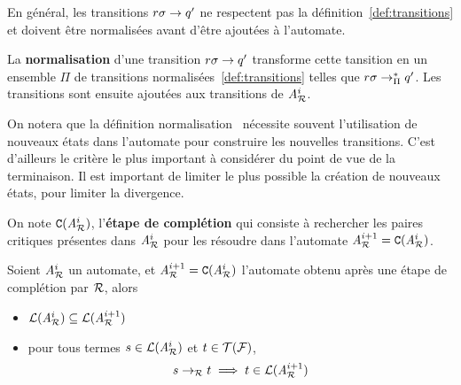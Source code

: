 En général, les transitions $r\sigma \rightarrow q'$ ne respectent pas la définition~\ref{def:transitions}
et doivent être normalisées avant d'être ajoutées à l'automate.


\begin{definition}
  La \textbf{normalisation} d'une transition $r\sigma \rightarrow q'$ transforme cette
  tansition en un ensemble $\Pi$ de transitions normalisées~\ref{def:transitions}
  telles que $r\sigma \rightarrow_\Pi^* q'$. Les transitions sont ensuite ajoutées aux transitions de ${\mathit A}_{\mathcal R}^i$.
\end{definition}
On notera que la définition normalisation~\cite{Genet-RTA98} nécessite 
souvent l'utilisation de nouveaux états dans l'automate pour construire 
les nouvelles transitions. C'est d'ailleurs le critère le plus important
à considérer du point de vue de la terminaison. Il est important de limiter le
plus possible la création de nouveaux états, pour limiter la divergence.

\begin{definition}
  On note $\mathtt{C}({\mathit A}_{\mathcal R}^i)$, l'\textbf{étape de complétion} qui consiste à rechercher les paires critiques présentes
  dans ${\mathit A}_{\mathcal R}^i$ pour les résoudre dans l'automate ${\mathit A}_{\mathcal R}^{i+1} = \mathtt{C}({\mathit A}_{\mathcal R}^i)$.
\end{definition}

\begin{property}
  Soient ${\mathit A}_{\mathcal R}^i$ un automate, et ${\mathit A}_{\mathcal R}^{i+1} = \mathtt{C}({\mathit A}_{\mathcal R}^i)$ l'automate obtenu après une
  étape de complétion par $\mathcal R$, alors
  \begin{itemize}
  \item $\mathcal{L}({\mathit A}_{\mathcal R}^i) \subseteq \mathcal{L}({\mathit A}_{\mathcal R}^{i+1})$

  \item  pour tous termes $s \in \mathcal{L}({\mathit A}_{\mathcal R}^i)$ et $t \in \mathcal{T(F)}$,
    \[s \rightarrow_\mathcal R t \; \Longrightarrow \; t\in \mathcal{L}({\mathit A}_{\mathcal R}^{i+1})\]
  \end{itemize}
\end{property}


